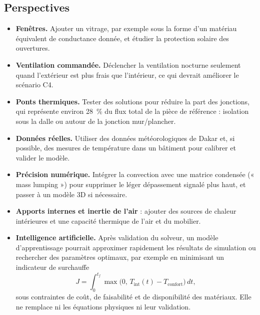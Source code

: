 \subsection{Perspectives}
\begin{itemize}
	\item \textbf{Fenêtres.} Ajouter un vitrage, par exemple sous la forme d'un matériau équivalent de
	conductance donnée, et étudier la protection solaire des ouvertures.
	\item \textbf{Ventilation commandée.} Déclencher la ventilation nocturne seulement quand l'extérieur est plus
	frais que l'intérieur, ce qui devrait améliorer le scénario C4.
	\item \textbf{Ponts thermiques.} Tester des solutions pour réduire la part des jonctions, qui représente environ
	28~\% du flux total de la pièce de référence : isolation sous la dalle ou autour de la jonction mur/plancher.
	\item \textbf{Données réelles.} Utiliser des données météorologiques de Dakar et, si possible, des mesures
	de température dans un bâtiment pour calibrer et valider le modèle.
	\item \textbf{Précision numérique.} Intégrer la convection avec une matrice condensée (« mass lumping ») pour
	supprimer le léger dépassement signalé plus haut, et passer à un modèle 3D si nécessaire.
	\item \textbf{Apports internes et inertie de l'air} : ajouter des sources de chaleur intérieures et une capacité
	thermique de l'air et du mobilier.
	\item \textbf{Intelligence artificielle.} Après validation du solveur, un modèle d'apprentissage pourrait
	approximer rapidement les résultats de simulation ou rechercher des paramètres optimaux, par exemple en
	minimisant un indicateur de surchauffe
	\begin{equation}
		J=\int_0^{t_f}\max\bigl(0,\,T_{\mathrm{int}}(t)-T_{\mathrm{confort}}\bigr)\,dt ,
	\end{equation}
	sous contraintes de coût, de faisabilité et de disponibilité des matériaux. Elle ne remplace ni les
	équations physiques ni leur validation.
\end{itemize}